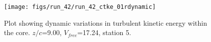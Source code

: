 \begin{figure}[H]
\centering
\texttt{[image: figs/run\_42/run\_42\_ctke\_01rdynamic]}
\caption{Plot showing dynamic variations in turbulent kinetic energy within the core. $z/c$=9.00, $V_{free}$=17.24, station 5.}
\label{fig:run_42_ctke_01rdynamic}
\end{figure}


